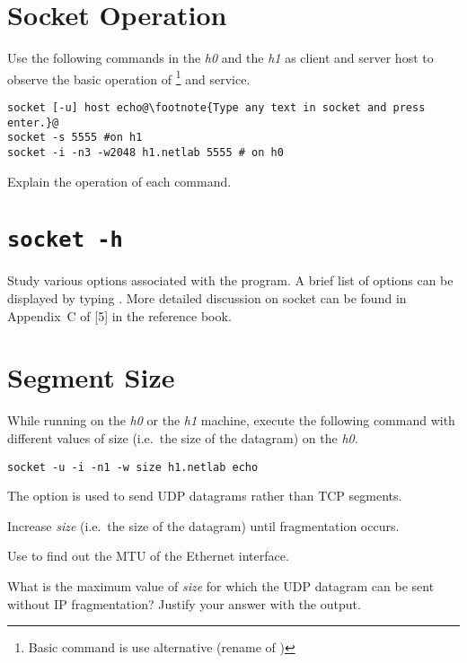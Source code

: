 \documentclass{../UTNetLab}
\begin{document}
\section{Socket Operation}
Use the following commands in the \textit{h0} and the \textit{h1} as client and server host to observe the basic operation of \footnote{Basic command is  use alternative  (rename of )} and  service.
\begin{lstlisting}[emph={host, h1,netlab},morekeywords={[3]echo}]
socket [-u] host echo@\footnote{Type any text in socket and press enter.}@
socket -s 5555 #on h1
socket -i -n3 -w2048 h1.netlab 5555 # on h0
    \end{lstlisting}

\begin{report}
    \item Explain the operation of each command.
\end{report}

\section{\texttt{socket -h}}
Study various options associated with the  program.
A brief list of options can be displayed by typing .
More detailed discussion on socket can be found in Appendix~C of [5] in the reference book.

\section{Segment Size}
While running  on the \textit{h0} or the \textit{h1} machine, execute the following command with different values of size (i.e.\  the size of the datagram) on the \textit{h0}.

\begin{lstlisting}[emph={size, h1,netlab},morekeywords={[3]echo}]
socket -u -i -n1 -w size h1.netlab echo
    \end{lstlisting}

The  option is used to send UDP datagrams rather than TCP segments.

Increase \textit{size} (i.e.\  the size of the datagram) until fragmentation occurs.

Use  to find out the MTU of the Ethernet interface.

\begin{report}
    \item What is the maximum value of \textit{size} for which the UDP datagram can be sent without IP fragmentation?
    Justify your answer with the  output.
\end{report}
\end{document}
